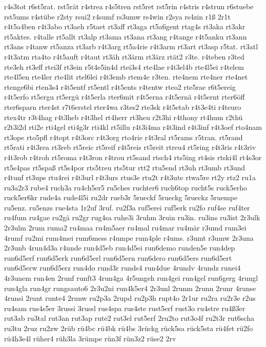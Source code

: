 {r4s3tot
r6st5rat.
rst5rät
r4strea
r4s5tren
rst5ret
rst5rin
r4stris
r4strun
r6stuebe
rst5ums
r4stübe
r2sty
rsui2
r4sumf
rs3umw
rs4win
r2sya
rs4zin
r1ß
2r1t
r4t5a4ben
r4t3abo
rt3aeh
r5taet
rt3aff
rt3aga
rt5a6gent
rtag4s
rt3aka
rt3akr
rt5aktes.
r4talle
rt5allt
rt3alp
rt3ama
rt3ana
rt3ang
r4tange
r4t5anku
rt3ann
rt3ans
r4tanw
rt5anza
rt3arb
r4t3arg
rt5a4rie
r4t3arm
rt3art
rt3asp
r5tat.
rt3atl
r4t3atm
rta4to
r4t5auft
r4taut
rt3äh
rt3ärm
rt3ärz
rtät2
r3te.
r4teben
r3ted
rte3eh
rt3eff
rtei3f
rt3ein
r5t4e5in4d
rtei3s4
rte4lae
r4t3el4b
rte4l5ei
r4telem
rte4l5en
rte4ler
rte4lit
rtel6lei
r4t3emb
rtem4e
r3ten.
rte4nem
rte4ner
rte4net
rtenge6bi
rten3s4
r4t5entf
rt5entl
r4t5ents
r4tentw
rteo2
rte5rae
r6t5ereig
r4t5erfo
rt5ergu
rt5ergü
r4t5erla
rter6mit
r4t5erna
r4t5ernä
r4t5ernt
rter6öff
rter6sparn
rter4st
r7t6erstel
rter4wa
r3tes2
rte3sk
r4t5etab
r4t3e4ti
r4teuro
rtex4tr
r3t4hag
r4t3heb
r4t3hel
rt4herr
rt3heu
r2t3hi
r4thony
rt4hum
r2thü
r2t3i2d
rti2e
rti4gel
rti4g3r
rti4kl
rt5illu
r4t3i4ma
r4t3ind
r4t3inf
r4t3oef
rto4nam
rt3ope
rto5pfl
r4topt
r4t3orc
r4t3org
rto4rie
r4t3ral
rt5rams
r5tran.
rt5rand
rt5rati
r4t3rea
rt3reb
rt5reic
rt5reif
r4t5reis
rt5reit
rtreu4
rt5ring
r4t3ris
r4t3riv
r4t3rob
r4troh
rt5roma
r4t3ron
r4trou
rt5sand
rtsch4
rts5ing
rt4sis
rtski4l
rt4s3or
rt5s4pas
rt5spaß
rt5s4por
rts5treu
rts5tur
rtt2
rtu5end
rt3uh
rt3umb
rt3und
r4tunf
rt3ups
rtu4rei
r4t3url
r4t3urs
rtus3e
rtu2t
r4t3ute
rtwa5re
rt2y
rtz2
ru1a
ru3a2r3
rube4
ruch3a
ru4ch5er5
ru5ches
ruchter6
ruch6top
rucht5s
ruck5erho
ruck5er6kr
rude4a
rude4l5i
ru2dr
rueb3r
5rueckf
5rueckg
5rueckz
5ruempe
ru5enz.
ru5enzs
rue4sta
1r2uf
3ruf.
ru2f3a
ruf5erei
ruf5erk
ru2fo
ruf4se
ruf4ter
ru4fum
ru4gae
ru2gä
ru2gr
rug4sa
ruhe3i
3ruhm
3ruin
ru3in.
ru3ins
ru3ist
2r3ulk
2r3ulm
2rum
ruma2
ru4maa
ru4m5aer
ru4mal
ru4mar
ru4mär
r3umd
rum3ei
4rumf
ru2mi
rum4mei
rum6mess
r4umpe
rum4ple
r4ums.
r3umt
r3umw
2r3una
2r3unb
4run4d3a
r4unde
run4d5eb
run4d5ei
run6demo
runden5e
run4dep
run6d5erf
run6d5erk
run6d5erl
run6d5ern
run6dero
run6d5ers
run6d5ert
run6d5erw
run6d5erz
run4do
rund3r
runds4
run4due
4rundv
4rundz
runei4
4r3unem
run4en
2runf
runft3
4run4ga
4r5ungeh
run4gei
run4gel
run6gerg
4rungl
run4gla
run4gr
rungsauto6
2r3u2ni
run4k5er4
2r3unl
2runm
2runn
2runr
4runse
4runsi
2runt
runte4
2runw
ru2p3a
2rupd
ru2p3h
rupt4o
2r1ur
ru2ra
ru2r3e
r2us
ru4sam
rus4s5er
3russi
3russl
rus4spa
rus4ste
rust5erf
rust3o
ru4stre
ru4ß3er
rut3ab
ru3tal
rut3an
rut3ap
rute2
rut3el
rut5erf
2ru2to
rut3o4f
ru2t3r
rut6scha
ru3tu
2ruz
ru2zw
2rüb
rü4bc
rü4bk
rü4bs
3rückg
rück5sa
rück5sta
rü4fet
rü2fo
rü4h3e4l
rüher4
rüh3la
3rümpe
rün3f
rün3z2
rüse2
2rv
}
